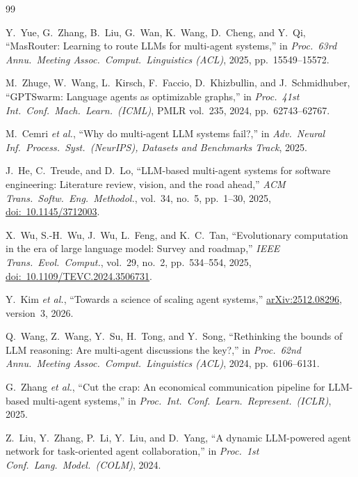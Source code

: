 \documentclass[11pt,a4paper]{article}
\begin{document}
\FloatBarrier

\begingroup
\footnotesize
\setlength{\parskip}{0pt}
\begin{thebibliography}{99}
\setlength{\itemsep}{2pt}
\sloppy

Y.~Yue, G.~Zhang, B.~Liu, G.~Wan, K.~Wang, D.~Cheng, and Y.~Qi, ``MasRouter: Learning to route LLMs for
multi-agent systems,'' in \emph{Proc.\ 63rd Annu.\ Meeting Assoc.\ Comput.\ Linguistics (ACL)}, 2025,
pp.~15549--15572.

M.~Zhuge, W.~Wang, L.~Kirsch, F.~Faccio, D.~Khizbullin, and J.~Schmidhuber, ``GPTSwarm: Language agents as
optimizable graphs,'' in \emph{Proc.\ 41st Int.\ Conf.\ Mach.\ Learn.\ (ICML)}, PMLR vol.~235, 2024,
pp.~62743--62767.

M.~Cemri \emph{et al.}, ``Why do multi-agent LLM systems fail?,'' in \emph{Adv.\ Neural Inf.\ Process.\
Syst.\ (NeurIPS), Datasets and Benchmarks Track}, 2025.

J.~He, C.~Treude, and D.~Lo, ``LLM-based multi-agent systems for software engineering: Literature review,
vision, and the road ahead,'' \emph{ACM Trans.\ Softw.\ Eng.\ Methodol.}, vol.~34, no.~5, pp.~1--30, 2025,
\href{https://doi.org/10.1145/3712003}{doi:~10.1145/3712003}.

X.~Wu, S.-H.~Wu, J.~Wu, L.~Feng, and K.~C.~Tan, ``Evolutionary computation in the era of large language
model: Survey and roadmap,'' \emph{IEEE Trans.\ Evol.\ Comput.}, vol.~29, no.~2, pp.~534--554, 2025,
\href{https://doi.org/10.1109/TEVC.2024.3506731}{doi:~10.1109/TEVC.2024.3506731}.

Y.~Kim \emph{et al.}, ``Towards a science of scaling agent systems,''
\href{https://arxiv.org/abs/2512.08296}{arXiv:2512.08296}, version~3, 2026.

Q.~Wang, Z.~Wang, Y.~Su, H.~Tong, and Y.~Song, ``Rethinking the bounds of LLM reasoning: Are multi-agent
discussions the key?,'' in \emph{Proc.\ 62nd Annu.\ Meeting Assoc.\ Comput.\ Linguistics (ACL)}, 2024,
pp.~6106--6131.

G.~Zhang \emph{et al.}, ``Cut the crap: An economical communication pipeline for LLM-based multi-agent
systems,'' in \emph{Proc.\ Int.\ Conf.\ Learn.\ Represent.\ (ICLR)}, 2025.

Z.~Liu, Y.~Zhang, P.~Li, Y.~Liu, and D.~Yang, ``A dynamic LLM-powered agent network for task-oriented agent
collaboration,'' in \emph{Proc.\ 1st Conf.\ Lang.\ Model.\ (COLM)}, 2024.


\end{thebibliography}
\end{document}
